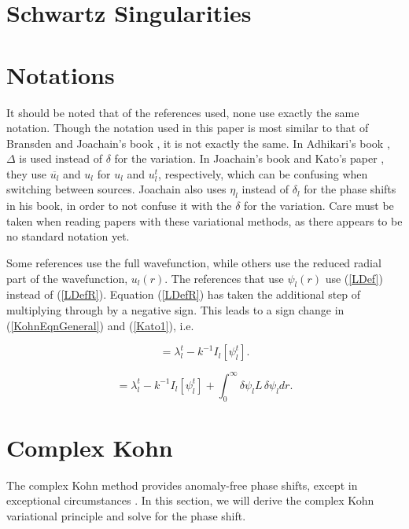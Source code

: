\documentclass[Dissertation.tex]{subfiles}
\begin{document}
\section{Schwartz Singularities}
\label{sec:SchwartzSing}


\section{Notations}
It should be noted that of the references used, none use exactly the same notation.  Though the notation used in this paper is most similar to that of Bransden and Joachain's book \cite{Bransden2003}, it is not exactly the same.  In Adhikari's book \cite{Adhikari1998}, $\Delta$ is used instead of $\delta$ for the variation.  In Joachain's book \cite{Joachain1979} and Kato's paper \cite{Kato1951a}, they use $\overline{u_l}$ and $u_l$ for $u_l$ and $u_l^t$, respectively, which can be confusing when switching between sources.  Joachain also uses $\eta_l$ instead of $\delta_l$ for the phase shifts in his book, in order to not confuse it with the $\delta$ for the variation.  Care must be taken when reading papers with these variational methods, as there appears to be no standard notation yet.

Some references use the full wavefunction, while others use the reduced radial part of the wavefunction, $u_l(r)$.  The references that use $\psi_l(r)$ use (\ref{LDef}) instead of (\ref{LDefR}).  Equation (\ref{LDefR}) has taken the additional step of multiplying through by a negative sign.  This leads to a sign change in (\ref{KohnEqnGeneral}) and (\ref{Kato1}), i.e.

\begin{equation}
[\lambda_l] = \lambda_l^t - k^{-1} I_l[\psi_l^t].
\label{KohnEqnGeneralPsi}
\end{equation}

\begin{equation}
[\lambda_l] = \lambda_l^t - k^{-1} I_l[\psi_l^t] + \int_0^\infty \delta \psi_l L \, \delta \psi_l dr.
\label{Kato1Psi}
\end{equation}




\section{Complex Kohn}

The complex Kohn method provides anomaly-free phase shifts, except in exceptional circumstances \cite{Lucchese1989}.  In this section, we will derive the complex Kohn variational principle and solve for the phase shift.
\end{document}
